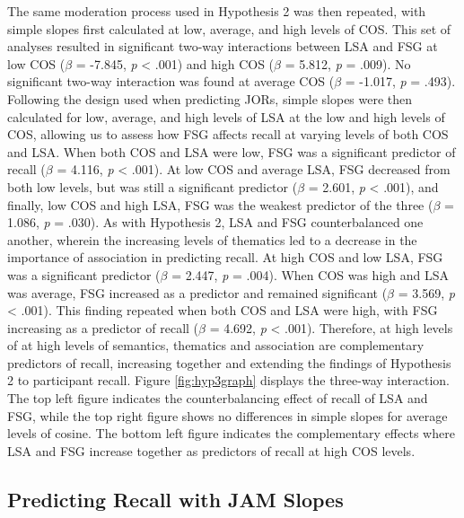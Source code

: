 \documentclass[english,,man]{apa6}
\begin{document}
The same moderation process used in Hypothesis 2 was then repeated, with
simple slopes first calculated at low, average, and high levels of COS.
This set of analyses resulted in significant two-way interactions
between LSA and FSG at low COS (\(\beta\) = -7.845, \emph{p} \textless{}
.001) and high COS (\(\beta\) = 5.812, \emph{p} = .009). No significant
two-way interaction was found at average COS (\(\beta\) = -1.017,
\emph{p} = .493). Following the design used when predicting JORs, simple
slopes were then calculated for low, average, and high levels of LSA at
the low and high levels of COS, allowing us to assess how FSG affects
recall at varying levels of both COS and LSA. When both COS and LSA were
low, FSG was a significant predictor of recall (\(\beta\) = 4.116,
\emph{p} \textless{} .001). At low COS and average LSA, FSG decreased
from both low levels, but was still a significant predictor (\(\beta\) =
2.601, \emph{p} \textless{} .001), and finally, low COS and high LSA,
FSG was the weakest predictor of the three (\(\beta\) = 1.086, \emph{p}
= .030). As with Hypothesis 2, LSA and FSG counterbalanced one another,
wherein the increasing levels of thematics led to a decrease in the
importance of association in predicting recall. At high COS and low LSA,
FSG was a significant predictor (\(\beta\) = 2.447, \emph{p} = .004).
When COS was high and LSA was average, FSG increased as a predictor and
remained significant (\(\beta\) = 3.569, \emph{p} \textless{} .001).
This finding repeated when both COS and LSA were high, with FSG
increasing as a predictor of recall (\(\beta\) = 4.692, \emph{p}
\textless{} .001). Therefore, at high levels of at high levels of
semantics, thematics and association are complementary predictors of
recall, increasing together and extending the findings of Hypothesis 2
to participant recall. Figure \ref{fig:hyp3graph} displays the three-way
interaction. The top left figure indicates the counterbalancing effect
of recall of LSA and FSG, while the top right figure shows no
differences in simple slopes for average levels of cosine. The bottom
left figure indicates the complementary effects where LSA and FSG
increase together as predictors of recall at high COS levels.

\subsection{Predicting Recall with JAM
Slopes}\label{predicting-recall-with-jam-slopes}
\end{document}
